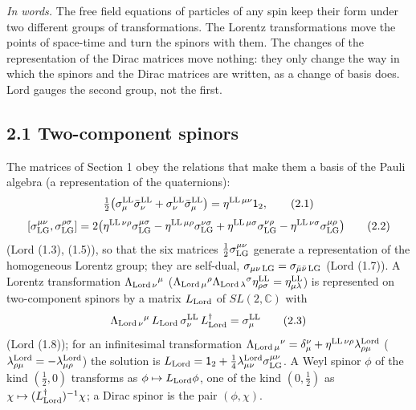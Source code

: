 \documentclass[
  10pt,
]{article}
\begin{document}
\emph{In words.} The free field equations of particles of any spin keep
their form under two different groups of transformations. The Lorentz
transformations move the points of space-time and turn the spinors with
them. The changes of the representation of the Dirac matrices move
nothing: they only change the way in which the spinors and the Dirac
matrices are written, as a change of basis does. Lord gauges the second
group, not the first.

\hypertarget{two-component-spinors}{%
\subsection{2.1 Two-component spinors}\label{two-component-spinors}}

The matrices of Section 1 obey the relations that make them a basis of
the Pauli algebra (a representation of the quaternions):
\[\tfrac12\big(\sigma^{\rm LL}_\mu\bar\sigma^{\rm LL}_\nu+\sigma^{\rm LL}_\nu\bar\sigma^{\rm LL}_\mu\big)=\eta^{{\rm LL}\,\mu\nu}\mathsf 1_2,\tag{2.1}\]
\[[\sigma^{\mu\nu}_{\rm LG},\sigma^{\rho\sigma}_{\rm LG}]=2\big(\eta^{{\rm LL}\,\nu\rho}\sigma^{\mu\sigma}_{\rm LG}-\eta^{{\rm LL}\,\mu\rho}\sigma^{\nu\sigma}_{\rm LG}+\eta^{{\rm LL}\,\mu\sigma}\sigma^{\nu\rho}_{\rm LG}-\eta^{{\rm LL}\,\nu\sigma}\sigma^{\mu\rho}_{\rm LG}\big)\tag{2.2}\]
(Lord (1.3), (1.5)), so that the six matrices
\(\tfrac12\sigma^{\mu\nu}_{\rm LG}\) generate a representation of the
homogeneous Lorentz group; they are self-dual,
\(\sigma_{\mu\nu\,{\rm LG}}=\sigma_{\bar\mu\bar\nu\,{\rm LG}}\) (Lord
(1.7)). A Lorentz transformation \(\Lambda_{{\rm Lord}\,\nu}{}^\mu\)
(\(\Lambda_{{\rm Lord}\,\mu}{}^\rho\Lambda_{{\rm Lord}\,\lambda}{}^\sigma\eta^{\rm LL}_{\rho\sigma}=\eta^{\rm LL}_{\mu\lambda}\))
is represented on two-component spinors by a matrix \(L_{\rm Lord}\) of
\(SL(2,\mathbb C)\) with
\[\Lambda_{{\rm Lord}\,\nu}{}^\mu\,L_{\rm Lord}\,\sigma^{\rm LL}_\nu\,L_{\rm Lord}^\dagger=\sigma^{\rm LL}_\mu\tag{2.3}\]
(Lord (1.8)); for an infinitesimal transformation
\(\Lambda_{{\rm Lord}\,\mu}{}^\nu=\delta_\mu^\nu+\eta^{{\rm LL}\,\nu\rho}\lambda^{\rm Lord}_{\rho\mu}\)
(\(\lambda^{\rm Lord}_{\rho\mu}=-\lambda^{\rm Lord}_{\mu\rho}\)) the
solution is
\(L_{\rm Lord}=\mathsf 1_2+\tfrac14\lambda^{\rm Lord}_{\mu\nu}\sigma^{\mu\nu}_{\rm LG}\).
A Weyl spinor \(\phi\) of the kind \((\tfrac12,0)\) transforms as
\(\phi\mapsto L_{\rm Lord}\phi\), one of the kind \((0,\tfrac12)\) as
\(\chi\mapsto(L_{\rm Lord}^\dagger)^{-1}\chi\); a Dirac spinor is the
pair \((\phi,\chi)\).
\end{document}
